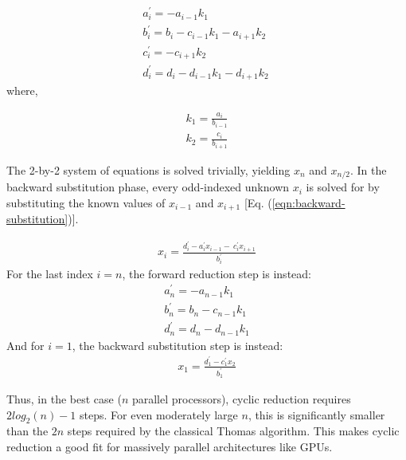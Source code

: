 \documentclass{elsarticle}
\begin{document}
\begin{align} 
& a^{\prime}_i = -a_{i-1}k_1 \
    \label{eqn:forward-reduction-1}& \\
& b^{\prime}_i = b_i - c_{i-1}k_1 - a_{i+1}k_2 \
    \label{eqn:forward-reduction-2}& \\
& c^{\prime}_i = -c_{i+1}k_2 \
    \label{eqn:forward-reduction-3}& \\
& d^{\prime}_i = d_i - d_{i-1}k_1  - d_{i+1}k_2 \
    \label{eqn:forward-reduction-4}&
\end{align}
%
where,

\begin{align}
& k_1 = \frac{a_i}{b_{i-1}} \label{eqn:k1-update}& \\
& k_2 = \frac{c_i}{b_{i+1}} \label{eqn:k2-update}&
\end{align}

The 2-by-2 system of equations is solved trivially,
yielding $x_n$ and $x_{n/2}$.
In the backward substitution phase,
every odd-indexed unknown $x_i$ is solved for by
substituting the known values of $x_{i-1}$ and $x_{i+1}$
[Eq. (\ref{eqn:backward-substitution})].

\begin{align} \label{eqn:backward-substitution}
x_i = \frac{d^{\prime}_i - a^{\prime}_ix_{i-1} - \
    c^{\prime}_ix_{i+1}}{b^{\prime}_i}
\end{align}
%
For the last index $i=n$,
the forward reduction step is instead:
\begin{align} \label{eqn:forward-reduction-last}
    & a^{\prime}_n = -a_{n-1}k_1 & \\
    & b^{\prime}_n = b_n - c_{n-1}k_1 & \\
    & d^{\prime}_n = d_n - d_{n-1}k_1&
\end{align}
%
And for $i=1$, the backward substitution step is instead:
\begin{align} \label{eqn:backward-substitution-first}
x_1 = \frac{d^{\prime}_1 - c^{\prime}_1x_{2}}{b^{\prime}_1}
\end{align}

Thus, in the best case ($n$ parallel processors),
cyclic reduction requires 
$2log_2(n) - 1$ steps.
For even moderately large $n$,
this is significantly smaller than
the $2n$ steps required by the classical Thomas algorithm.
This makes cyclic reduction a good fit
for massively parallel architectures like GPUs.
\end{document}
